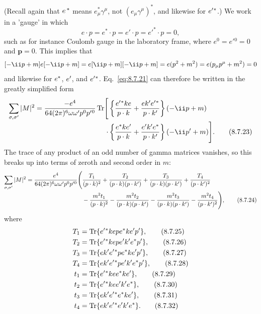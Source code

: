 \endgroup
(Recall again that $\sl{e}^{\,*}$ means $e^*_\mu\gamma^\mu$, not
$(e_\mu\gamma^\mu)^*$, and likewise for $\sl{e'}{}^*$.) We work in a
'gauge' in which
\begin{equation}
e\cdot p=e^*\cdot p=e'\cdot p=e'^*\cdot p=0,
\tag{8.7.22}\label{eq:8.7.22}
\end{equation}
such as for instance Coulomb gauge in the laboratory frame, where
$e^0=e'{}^0=0$ and $\mathbf p=0$. This implies that
\[
[-\ii\sl{p}+m]\sl{e}[-\ii\sl{p}+m]
=\sl{e}[\ii\sl{p}+m][-\ii\sl{p}+m]
=\sl{e}(p^2+m^2)=\sl{e}(p_\mu p^\mu+m^2)=0
\]
and likewise for $\sl{e}^*$, $\sl{e'}$, and $\sl{e'}{}^*$. Eq.~\eqref{eq:8.7.21}
can therefore be written in the greatly simplified form
\begin{align}
\sum_{\sigma,\sigma'}|M|^2
={-e^4\over64(2\pi)^6\omega\omega'p^0p'{}^0}
\operatorname{Tr}\Biggl[&\left\{{\sl{e'}{}^*\sl{k}\sl{e}\over p\cdot k}
+{\sl{e}\sl{k'}\sl{e'}{}^*\over p\cdot k'}\right\}(-\ii\sl{p}+m)
\notag\\[-2pt]
\cdot&\left\{{\sl{e}^*\sl{k}\sl{e'}\over p\cdot k}
+{\sl{e'}\sl{k'}\sl{e}^*\over p\cdot k'}\right\}(-\ii\sl{p'}+m)\Biggr].
\tag{8.7.23}\label{eq:8.7.23}
\end{align}
The trace of any product of an odd number of gamma matrices vanishes, so this
breaks up into terms of zeroth and second order in $m$:
\begin{align}
\sum_{\sigma,\sigma'}|M|^2={e^4\over64(2\pi)^6\omega\omega'p^0p'{}^0}
\Biggl(&{T_1\over(p\cdot k)^2}+{T_2\over(p\cdot k)(p\cdot k')}
+{T_3\over(p\cdot k)(p\cdot k')}+{T_4\over(p\cdot k')^2}
\notag\\[-2pt]
&-{m^2t_1\over(p\cdot k)^2}-{m^2t_2\over(p\cdot k)(p\cdot k')}
-{m^2t_3\over(p\cdot k)(p\cdot k')}-{m^2t_4\over(p\cdot k')^2}\Biggr),
\tag{8.7.24}\label{eq:8.7.24}
\end{align}
where
\begin{align}
T_1&=\operatorname{Tr}\{\sl{e'}{}^*\sl{k}\sl{e}\sl{p}\sl{e}^*\sl{k}\sl{e'}\sl{p'}\},
\tag{8.7.25}\label{eq:8.7.25}\\
T_2&=\operatorname{Tr}\{\sl{e'}{}^*\sl{k}\sl{e}\sl{p}\sl{e'}\sl{k'}\sl{e}^*\sl{p'}\},
\tag{8.7.26}\label{eq:8.7.26}\\
T_3&=\operatorname{Tr}\{\sl{e}\sl{k'}\sl{e'}{}^*\sl{p}\sl{e}^*\sl{k}\sl{e'}\sl{p'}\},
\tag{8.7.27}\label{eq:8.7.27}\\
T_4&=\operatorname{Tr}\{\sl{e}\sl{k'}\sl{e'}{}^*\sl{p}\sl{e'}\sl{k'}\sl{e}^*\sl{p'}\},
\tag{8.7.28}\label{eq:8.7.28}\\
t_1&=\operatorname{Tr}\{\sl{e'}{}^*\sl{k}\sl{e}\sl{e}^*\sl{k}\sl{e'}\},
\tag{8.7.29}\label{eq:8.7.29}\\
t_2&=\operatorname{Tr}\{\sl{e'}{}^*\sl{k}\sl{e}\sl{e'}\sl{k'}\sl{e}^*\},
\tag{8.7.30}\label{eq:8.7.30}\\
t_3&=\operatorname{Tr}\{\sl{e}\sl{k'}\sl{e'}{}^*\sl{e}^*\sl{k}\sl{e'}\},
\tag{8.7.31}\label{eq:8.7.31}\\
t_4&=\operatorname{Tr}\{\sl{e}\sl{k'}\sl{e'}{}^*\sl{e'}\sl{k'}\sl{e}^*\}.
\tag{8.7.32}\label{eq:8.7.32}
\end{align}
